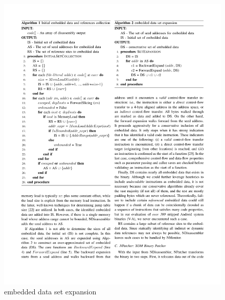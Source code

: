 \begin{figure}[t]
\begin{minipage}[b]{0.45\textwidth}
	\end{minipage}
 	\hfill
	\begin{minipage}[b]{0.45\textwidth}
		\centering	
		\begin{algorithm}[H]
		\caption{embedded data set expansion}
		\label{algo:seedexpansion}
		\includegraphics[width=\textwidth]{norax/figures/datasetexpansion}
		\end{algorithm}	
	\end{minipage}
\end{figure}


% 
%



